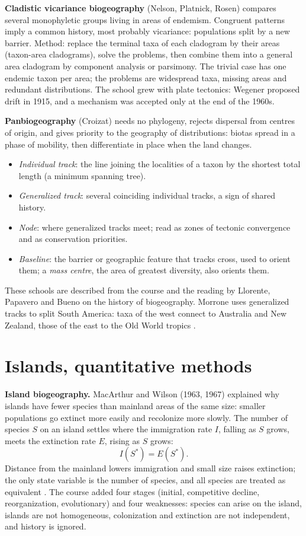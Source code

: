 \textbf{Cladistic vicariance biogeography}
(Nelson, Platnick, Rosen) compares several
monophyletic groups living in areas of
endemism. Congruent patterns imply a
common history, most probably vicariance:
populations split by a new barrier.
Method: replace the terminal taxa of each
cladogram by their areas (taxon-area
cladograms), solve the problems, then
combine them into a general area cladogram
by component analysis or parsimony. The
trivial case has one endemic taxon per
area; the problems are widespread taxa,
missing areas and redundant distributions.
The school grew with plate tectonics:
Wegener proposed drift in 1915, and a
mechanism was accepted only at the end of
the 1960s.

\textbf{Panbiogeography} (Croizat) needs
no phylogeny, rejects dispersal from
centres of origin, and gives priority to
the geography of distributions: biotas
spread in a phase of mobility, then
differentiate in place when the land
changes.
\begin{itemize}
\item \emph{Individual track}: the line
joining the localities of a taxon by the
shortest total length (a minimum spanning
tree).
\item \emph{Generalized track}: several
coinciding individual tracks, a sign of
shared history.
\item \emph{Node}: where generalized tracks
meet; read as zones of tectonic
convergence and as conservation
priorities.
\item \emph{Baseline}: the barrier or
geographic feature that tracks cross, used
to orient them; a \emph{mass centre}, the
area of greatest diversity, also orients
them.
\end{itemize}
These schools are described from the
course and the reading by
Llorente, Papavero and Bueno on the
history of biogeography.
Morrone uses generalized tracks to split
South America: taxa of the west connect to
Australia and New Zealand, those of the
east to the Old World tropics
\cite{morrone2001biogeografia}.

\section{Islands, quantitative methods}
\label{section-islands}

\textbf{Island biogeography.} MacArthur and
Wilson (1963, 1967) explained why islands
have fewer species than mainland areas of
the same size: smaller populations go
extinct more easily and recolonize more
slowly. The number of species $S$ on an
island settles where the immigration rate
$I$, falling as $S$ grows, meets the
extinction rate $E$, rising as $S$ grows:
$$
I(S^{*}) = E(S^{*}).
$$
Distance from the mainland lowers
immigration and small size raises
extinction; the only state variable is
the number of species, and all species are
treated as equivalent
\cite[Chapter 1]{hubbell2001unified}. The
course added four stages (initial,
competitive decline, reorganization,
evolutionary) and four weaknesses: species
can arise on the island, islands are not
homogeneous, colonization and extinction
are not independent, and history is
ignored.

